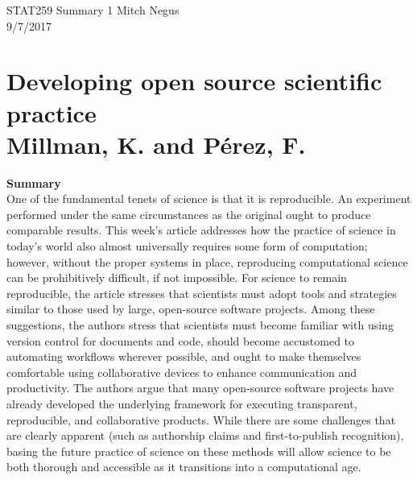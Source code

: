 \documentclass{report}
\newcommand{\tab}{\-\hspace{1cm}}
\begin{document}
\thispagestyle{empty}
\sffamily

\large {STAT259 Summary {1} \hfill Mitch Negus\\
		\hspace*{\fill} 9/7/2017\\ }
\section*{\textsf{Developing open source scientific practice \\ \normalsize Millman, K. and P\'erez, F.}}

\textbf{Summary}\\
\tab One of the fundamental tenets of science is that it is reproducible. An experiment performed under the same circumstances as the original ought to produce comparable results. This week's article addresses how the practice of science in today's world also almost universally requires some form of computation; however, without the proper systems in place, reproducing computational science can be prohibitively difficult, if not impossible. For science to remain reproducible, the article stresses that scientists must adopt tools and strategies similar to those used by large, open-source software projects. Among these suggestions, the authors stress that scientists must become familiar with using version control for documents and code, should become accustomed to automating workflows wherever possible, and ought to make themselves comfortable using collaborative devices to enhance communication and productivity. The authors argue that many open-source software projects have already developed the underlying framework for executing transparent, reproducible, and collaborative products. While there are some challenges that are clearly apparent (such as authorship claims and first-to-publish recognition), basing the future practice of science on these methods will allow science to be both thorough and accessible as it transitions into a computational age.
\end{document}
